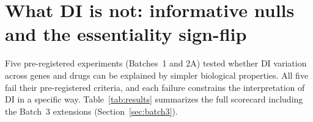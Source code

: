 \documentclass[11pt]{article}
\begin{document}
\section{What DI is not: informative nulls and the essentiality
sign-flip}
\label{sec:whatnot}

Five pre-registered experiments (Batches~1 and 2A) tested whether DI
variation across genes and drugs can be explained by simpler biological
properties.  All five fail their pre-registered criteria, and each
failure constrains the interpretation of DI in a specific way.
Table~\ref{tab:results} summarizes the full scorecard including the
Batch~3 extensions (Section~\ref{sec:batch3}).
\end{document}
